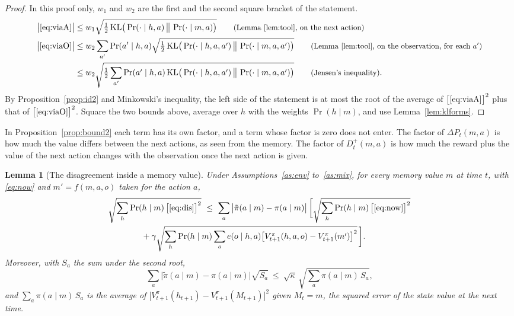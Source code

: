 \documentclass{article}
\newtheorem{lemma}[proposition]{Lemma}
\theoremstyle{definition}
\newcommand{\KL}{\mathrm{KL}}
\newcommand{\dP}{\Delta P}
\newcommand{\why}[1]{\tag*{\small(#1)}}
\begin{document}
\begin{proof}
In this proof only, $w_1$ and $w_2$ are the first and the second square bracket of the statement.
\begin{align*}
\big|\eqref{eq:viaA}\big|&\le w_1\sqrt{\tfrac12\,\KL\big(\Pr(\cdot\mid h,a)\,\big\|\,\Pr(\cdot\mid m,a)\big)} \why{Lemma~\ref{lem:tool}, on the next action}\\
\big|\eqref{eq:viaO}\big|&\le w_2\sum_{a'}\Pr(a'\mid h,a)\sqrt{\tfrac12\,\KL\big(\Pr(\cdot\mid h,a,a')\,\big\|\,\Pr(\cdot\mid m,a,a')\big)} \why{Lemma~\ref{lem:tool}, on the observation, for each $a'$}\\
&\le w_2\sqrt{\tfrac12\sum_{a'}\Pr(a'\mid h,a)\,\KL\big(\Pr(\cdot\mid h,a,a')\,\big\|\,\Pr(\cdot\mid m,a,a')\big)} \why{Jensen's inequality}.
\end{align*}
By Proposition~\ref{prop:id2} and Minkowski's inequality, the left side of the statement is at most the root of the average of $\big[\eqref{eq:viaA}\big]^2$ plus that of $\big[\eqref{eq:viaO}\big]^2$. Square the two bounds above, average over $h$ with the weights $\Pr(h\mid m)$, and use Lemma~\ref{lem:klforms}.
\end{proof}

In Proposition~\ref{prop:bound2} each term has its own factor, and a term whose factor is zero does not enter. The factor of $\dP_t(m,a)$ is how much the value differs between the next actions, as seen from the memory. The factor of $D^+_t(m,a)$ is how much the reward plus the value of the next action changes with the observation once the next action is given.

\begin{lemma}[The disagreement inside a memory value]\label{lem:dis}
Under Assumptions~\ref{as:env} to~\ref{as:mix}, for every memory value $m$ at time $t$, with \eqref{eq:now} and $m'=f(m,a,o)$ taken for the action $a$,
\begin{align*}
&\sqrt{\sum_h\Pr(h\mid m)\,\big[\eqref{eq:dis}\big]^2}\ \le\ \sum_a\big|\tilde\pi(a\mid m)-\pi(a\mid m)\big|\,\bigg[\sqrt{\sum_h\Pr(h\mid m)\,\big[\eqref{eq:now}\big]^2}\\
&\qquad\qquad+\gamma\sqrt{\sum_h\Pr(h\mid m)\sum_oe(o\mid h,a)\big[V^\pi_{t+1}(h,a,o)-V^\pi_{t+1}(m')\big]^2}\,\bigg].
\end{align*}
Moreover, with $S_a$ the sum under the second root,
\[
\sum_a\big|\tilde\pi(a\mid m)-\pi(a\mid m)\big|\sqrt{S_a}\ \le\ \sqrt{\kappa}\,\sqrt{\sum_a\pi(a\mid m)\,S_a},
\]
and $\sum_a\pi(a\mid m)\,S_a$ is the average of $\big[V^\pi_{t+1}(h_{t+1})-V^\pi_{t+1}(M_{t+1})\big]^2$ given $M_t=m$, the squared error of the state value at the next time.
\end{lemma}
\end{document}
